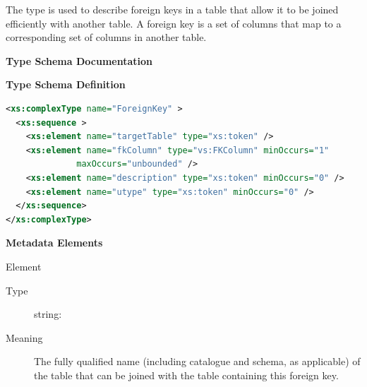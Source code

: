 \documentclass[11pt,a4paper]{ivoa}
\begin{document}
The  type is used to describe foreign
keys in a table that allow it to be joined efficiently with another
table.  A foreign key is a set of columns that map to a corresponding
set of columns in another table.  


\begin{generated}
\begingroup
      	\renewcommand*\descriptionlabel[1]{%
      	\hbox to 5.5em{\emph{#1}\hfil}}\vspace{2ex}\noindent\textbf{ Type Schema Documentation}



\vspace{1ex}\noindent\textbf{ Type Schema Definition}

\begin{lstlisting}[language=XML,basicstyle=\footnotesize]
<xs:complexType name="ForeignKey" >
  <xs:sequence >
    <xs:element name="targetTable" type="xs:token" />
    <xs:element name="fkColumn" type="vs:FKColumn" minOccurs="1"
              maxOccurs="unbounded" />
    <xs:element name="description" type="xs:token" minOccurs="0" />
    <xs:element name="utype" type="xs:token" minOccurs="0" />
  </xs:sequence>
</xs:complexType>
\end{lstlisting}

\vspace{0.5ex}\noindent\textbf{ Metadata Elements}

\begingroup\small\begin{bigdescription}\item[Element \xmlel{targetTable}]
\begin{description}
\item[Type] string: 
\item[Meaning] 
               The fully qualified name (including catalogue and schema, as
               applicable) of the table that can be joined with the 
               table containing this foreign key.
             

\end{description}
\end{bigdescription}
\end{generated}
\end{document}

